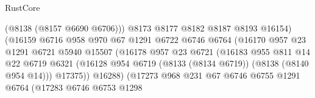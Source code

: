 \begin{lexlean}{RustCore}
\begin{coremodule}
                                          (@8138 (@8157 @6690 @6706)))
                                        @8173
                                        @8177
                                        @8182
                                        @8187
                                        @8193
                                        @16154)
                                      (@16159
                                        @6716
                                        @958
                                        @970
                                        @67
                                        @1291
                                        @6722
                                        @6746
                                        @6764
                                        (@16170
                                          @957
                                          @23
                                          @1291
                                          @6721
                                          @5940
                                          @15507
                                          (@16178
                                            @957
                                            @23
                                            @6721
                                            (@16183
                                              @955
                                              @811
                                              @14
                                              @22
                                              @6719
                                              @6321
                                              (@16128
                                                @954
                                                @6719
                                                (@8133 (@8134 @6719))
                                                (@8138 (@8140 @954 @14)))
                                              @17375))
                                          @16288)
                                        (@17273
                                          @968
                                          @231
                                          @67
                                          @6746
                                          @6755
                                          @1291
                                          @6764
                                          (@17283
                                            @6746
                                            @6753
                                            @1298

\end{coremodule}
\end{lexlean}
